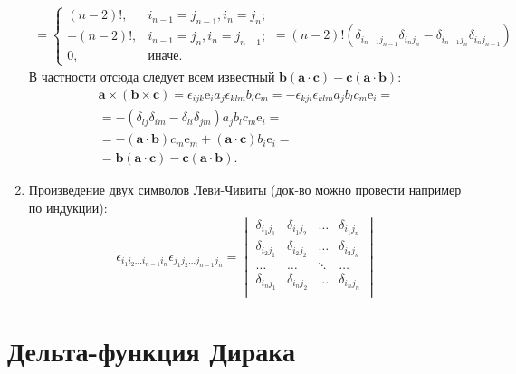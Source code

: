 \documentclass[a4paper,14pt]{extreport} %
\renewcommand{\vec}[1]{\bm{#1}}
\newcommand{\ort}[1]{\bm{\mathrm{e}}_#1}
\begin{document}
\begin{enumerate}
\begin{gather*}
		=
		\begin{cases}
		(n-2)!, & i_{n-1} = j_{n-1}, i_n = j_n; \\
		-(n-2)!, & i_{n-1} = j_n, i_n = j_{n-1}; \\
		0, & \text{иначе.}
		\end{cases} =
		(n-2)!(\delta_{i_{n-1} j_{n-1}} \delta_{i_{n} j_{n}} - \delta_{i_{n-1} j_{n}} \delta_{i_{n} j_{n-1}})
		\end{gather*}
		В частности отсюда следует всем известный $\vec{b}(\vec{a}\cdot\vec{c}) - \vec{c}(\vec{a}\cdot\vec{b})$:
		\begin{gather*}
		\vec{a}\times(\vec{b}\times\vec{c}) = \epsilon_{ijk} \ort{i} a_j \epsilon_{klm} b_l c_m = -\epsilon_{kji}\epsilon_{klm} a_j b_l c_m \ort{i} = \\ =
		- (\delta_{lj}\delta_{im} - \delta_{li}\delta_{jm}) a_j b_l c_m \ort{i} = \\ = - (\vec{a}\cdot\vec{b}) c_m \ort{m} + (\vec{a}\cdot\vec{c}) b_i \ort{i} = \\ = \vec{b}(\vec{a}\cdot\vec{c}) - \vec{c}(\vec{a}\cdot\vec{b}).
		\end{gather*}
		\item Произведение двух символов Леви-Чивиты (док-во можно провести например по индукции):
		\[
		\epsilon_{i_1 i_2 \ldots i_{n-1} i_n} \epsilon_{j_1 j_2 \ldots j_{n-1} j_n} =
		\begin{vmatrix}
		\delta_{i_1 j_1} & \delta_{i_1 j_2} & \ldots & \delta_{i_1 j_n} \\
		\delta_{i_2 j_1} & \delta_{i_2 j_2} & \ldots & \delta_{i_2 j_n} \\
		\ldots & \ldots & \ddots & \ldots \\
		\delta_{i_n j_1} & \delta_{i_n j_2} & \ldots & \delta_{i_n j_n} \\
		\end{vmatrix}
		\]
		
		\end{enumerate}
		
	\section{Дельта-функция Дирака}
	
\end{document}
